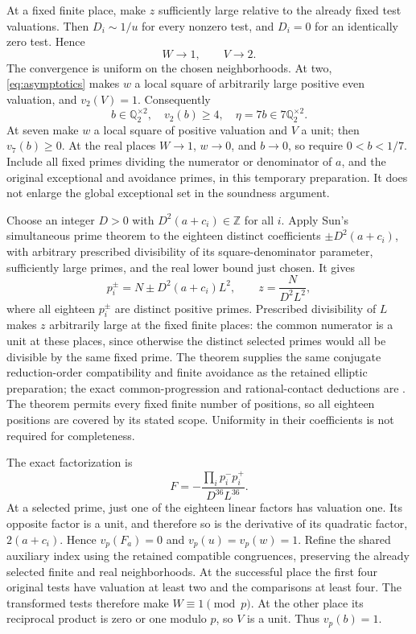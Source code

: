 \documentclass[11pt,a4paper]{article}
\newcommand{\Q}{\mathbb Q}\newcommand{\Z}{\mathbb Z}
\begin{document}
At a fixed finite place, make $z$ sufficiently large relative to the
already fixed test valuations. Then $D_i\sim1/u$ for every nonzero
test, and $D_i=0$ for an identically zero test. Hence
\[
                       W\longrightarrow1,\qquad V\longrightarrow2.
\]
The convergence is uniform on the chosen neighborhoods.
At two, \eqref{eq:asymptotics} makes $w$ a local square of arbitrarily
large positive even valuation, and $v_2(V)=1$. Consequently
\[
 b\in\Q_2^{\times2},\quad v_2(b)\ge4,\quad
 \eta=7b\in7\Q_2^{\times2}.
\]
At seven make $w$ a local square of positive valuation and $V$ a unit;
then $v_7(b)\ge0$. At the real places $W\to1$, $w\to0$, and
$b\to0$, so require $0<b<1/7$. Include all fixed primes dividing
the numerator or denominator of $a$, and the original exceptional
and avoidance primes, in this temporary preparation. It does not
enlarge the global exceptional set in the soundness argument.

Choose an integer $D>0$ with $D^2(a+c_i)\in\Z$ for all $i$.
Apply Sun's simultaneous prime theorem \cite[Theorem 4.1]{Sun} to
the eighteen distinct coefficients $\pm D^2(a+c_i)$, with arbitrary
prescribed divisibility of its square-denominator parameter, sufficiently
large primes, and the real lower bound just chosen. It gives
\[
 p_i^\pm=N\pm D^2(a+c_i)L^2,\qquad
                         z=\frac{N}{D^2L^2},
\]
where all eighteen $p_i^\pm$ are distinct positive primes.
Prescribed divisibility of $L$ makes $z$ arbitrarily large at the
fixed finite places: the common numerator is a unit at these places,
since otherwise the distinct selected primes would all be divisible
by the same fixed prime. The theorem supplies the same conjugate
reduction-order compatibility and finite avoidance as the retained
elliptic preparation; the exact common-progression and rational-contact
deductions are \cite[Section 2]{Dependencies}. The theorem permits
every fixed finite number of positions, so all eighteen positions
are covered by its stated scope. Uniformity in their coefficients is
not required for completeness.

The exact factorization is
\begin{equation}\label{eq:primefactorization}
                    F=-\frac{\prod_i p_i^-p_i^+}{D^{36}L^{36}}.
\end{equation}
At a selected prime, just one of the eighteen linear factors has
valuation one. Its opposite factor is a unit, and therefore so is
the derivative of its quadratic factor, $2(a+c_i)$. Hence
$v_p(F_a)=0$ and $v_p(u)=v_p(w)=1$.
Refine the shared auxiliary index using the retained compatible
congruences, preserving the already selected finite and real neighborhoods.
At the successful place the first four original tests have valuation
at least two and the comparisons at least four. The transformed tests
therefore make $W\equiv1\pmod p$.
At the other place its reciprocal product is zero or one modulo $p$,
so $V$ is a unit. Thus $v_p(b)=1$.
\end{document}
